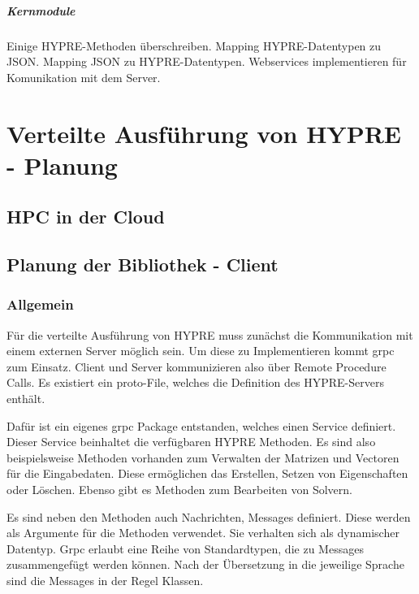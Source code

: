 \documentclass[a4paper,10pt]{article}
\numberwithin{figure}{section}
\numberwithin{table}{section}
\begin{document}
\subparagraph{Kernmodule}

Einige HYPRE-Methoden überschreiben.
Mapping HYPRE-Datentypen zu JSON.
Mapping JSON zu HYPRE-Datentypen.
Webservices implementieren für Komunikation mit dem Server.

\newpage











\section{Verteilte Ausführung von HYPRE - Planung}

\subsection{HPC in der Cloud}

\subsection{Planung der Bibliothek - Client}


\subsubsection{Allgemein}

Für die verteilte Ausführung von HYPRE muss zunächst die Kommunikation mit einem externen Server möglich sein.
Um diese zu Implementieren kommt grpc zum Einsatz.
Client und Server kommunizieren also über Remote Procedure Calls.
Es existiert ein proto-File, welches die Definition des HYPRE-Servers enthält.

Dafür ist ein eigenes grpc Package entstanden, welches einen Service definiert.
Dieser Service beinhaltet die verfügbaren HYPRE Methoden.
Es sind also beispielsweise Methoden vorhanden zum Verwalten der Matrizen und Vectoren für die Eingabedaten.
Diese ermöglichen das Erstellen, Setzen von Eigenschaften oder Löschen.
Ebenso gibt es Methoden zum Bearbeiten von Solvern.

Es sind neben den Methoden auch Nachrichten, Messages definiert.
Diese werden als Argumente für die Methoden verwendet.
Sie verhalten sich als dynamischer Datentyp.
Grpc erlaubt eine Reihe von Standardtypen, die zu Messages zusammengefügt werden können.
Nach der Übersetzung in die jeweilige Sprache sind die Messages in der Regel Klassen.
\end{document}
